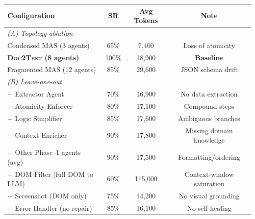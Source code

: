 \begin{tabular}{lccc}
\toprule
\textbf{Configuration} & \textbf{SR} & \textbf{Avg Tokens} & \textbf{Note} \\
\midrule
\multicolumn{4}{l}{\textit{(A) Topology ablation}} \\
\quad Condensed MAS (3 agents) & 65\% & 7,400 & Loss of atomicity \\
\quad \textbf{\textsc{Doc2Test} (8 agents)} & 100\% & 18,900 & \textbf{Baseline} \\
\quad Fragmented MAS (12 agents) & 85\% & 29,600 & JSON schema drift \\
\midrule
\multicolumn{4}{l}{\textit{(B) Leave-one-out}} \\
\quad $-$ Extractor Agent & 70\% & 16,900 & No data extraction \\
\quad $-$ Atomicity Enforcer & 80\% & 17,100 & Compound steps \\
\quad $-$ Logic Simplifier & 85\% & 17,600 & Ambiguous branches \\
\quad $-$ Context Enricher & 90\% & 17,800 & Missing domain knowledge \\
\quad $-$ Other Phase~1 agents (avg) & 90\% & 17,500 & Formatting/ordering \\
\quad $-$ DOM Filter (full DOM to LLM) & 60\% & 115,000 & Context-window saturation \\
\quad $-$ Screenshot (DOM only) & 75\% & 14,200 & No visual grounding \\
\quad $-$ Error Handler (no repair) & 85\% & 16,100 & No self-healing \\
\bottomrule
\end{tabular}
